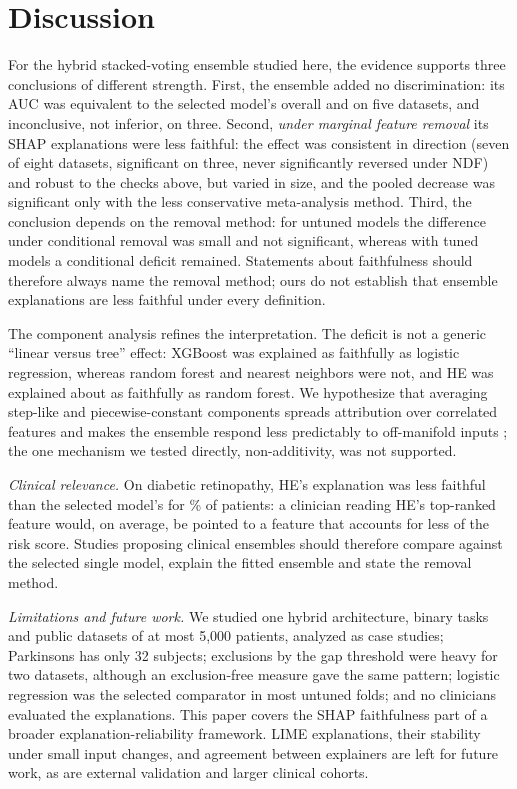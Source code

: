 \section{Discussion}
For the hybrid stacked-voting ensemble studied here, the evidence supports three conclusions of different strength. First, the ensemble added no discrimination: its AUC was equivalent to the selected model's overall and on five datasets, and inconclusive, not inferior, on three. Second, \emph{under marginal feature removal} its SHAP explanations were less faithful: the effect was consistent in direction (seven of eight datasets, significant on three, never significantly reversed under NDF) and robust to the checks above, but varied in size, and the pooled decrease was significant only with the less conservative meta-analysis method. Third, the conclusion depends on the removal method: for untuned models the difference under conditional removal was small and not significant, whereas with tuned models a conditional deficit remained. Statements about faithfulness should therefore always name the removal method; ours do not establish that ensemble explanations are less faithful under every definition.

The component analysis refines the interpretation. The deficit is not a generic ``linear versus tree'' effect: XGBoost was explained as faithfully as logistic regression, whereas random forest and nearest neighbors were not, and HE was explained about as faithfully as random forest. We hypothesize that averaging step-like and piecewise-constant components spreads attribution over correlated features and makes the ensemble respond less predictably to off-manifold inputs \cite{hooker_mentch,chen}; the one mechanism we tested directly, non-additivity, was not supported.

\emph{Clinical relevance.} On diabetic retinopathy, HE's explanation was less faithful than the selected model's for \NshareDR\% of patients: a clinician reading HE's top-ranked feature would, on average, be pointed to a feature that accounts for less of the risk score. Studies proposing clinical ensembles should therefore compare against the selected single model, explain the fitted ensemble and state the removal method.

\emph{Limitations and future work.} We studied one hybrid architecture, binary tasks and public datasets of at most 5{,}000 patients, analyzed as case studies; Parkinsons has only 32 subjects; exclusions by the gap threshold were heavy for two datasets, although an exclusion-free measure gave the same pattern; logistic regression was the selected comparator in most untuned folds; and no clinicians evaluated the explanations. This paper covers the SHAP faithfulness part of a broader explanation-reliability framework. LIME explanations, their stability under small input changes, and agreement between explainers are left for future work, as are external validation and larger clinical cohorts.

